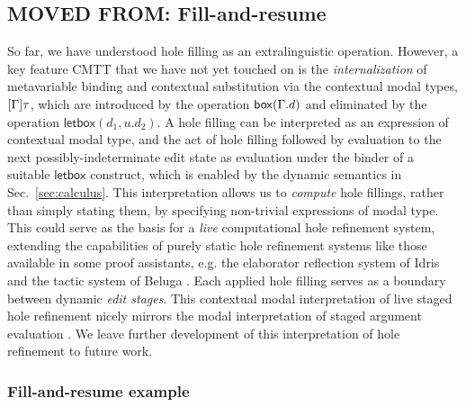 %
%
\subsection{MOVED FROM: Fill-and-resume}


So far, we have understood hole filling as an extralinguistic operation. 
%
However, a key feature CMTT that we have not yet touched on is the
\emph{internalization} of metavariable binding and contextual
substitution via the contextual modal types, $[\Gamma]\tau$, which
are introduced by the operation $\mathsf{box}(\Gamma.d)$ and
eliminated by the operation $\mathsf{letbox}(d_1, u.d_2)$.
%
A hole filling can be interpreted as an expression of contextual modal
type, and the act of hole filling followed by evaluation to the next
possibly-indeterminate edit state as evaluation under the binder of a
suitable $\mathsf{letbox}$ construct, which is enabled by the dynamic
semantics in Sec.~\ref{sec:calculus}.
%
This interpretation allows us to \emph{compute} hole fillings, rather
than simply stating them, by specifying non-trivial expressions of
modal type.
%
This could serve as the basis for a \emph{live} computational hole
refinement system, extending the capabilities of purely static hole
refinement systems like those available in some proof assistants,
e.g. the elaborator reflection system of Idris
\cite{brady2013idris,DBLP:conf/icfp/ChristiansenB16} and the tactic
system of Beluga
\cite{DBLP:conf/flops/Pientka10,pientka2015inductive}.
%
Each applied hole filling serves as a boundary between dynamic
\emph{edit stages}.
%
This contextual modal interpretation of live staged hole refinement
nicely mirrors the modal interpretation of staged argument evaluation
\cite{Davies:2001op}.
%
We leave further development of this interpretation of hole refinement
to future work.

\subsubsection{Fill-and-resume example}


